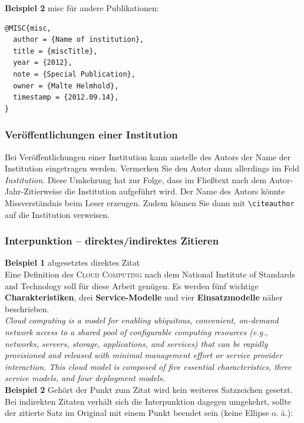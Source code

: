 \documentclass[xlevel, hyperref, nat, mp]{wise}
\newcommand\code[1]{\texttt{#1}}
\newcommand\command[1]{\code{\textbackslash{}#1}}
\newcommand{\cc}{\textsc{Cloud Computing }}
\begin{document}
\textbf{Beispiel 2} misc für andere Publikationen: 
\begin{lstlisting}
@MISC{misc,
  author = {Name of institution},
  title = {miscTitle},
  year = {2012},
  note = {Special Publication},
  owner = {Malte Helmhold},
  timestamp = {2012.09.14},
}

\end{lstlisting} 

\subsubsection{Veröffentlichungen einer Institution}
Bei Veröffentlichungen einer Institution kann anstelle des Autors der Name der Institution eingetragen werden. Vermerken Sie den Autor dann allerdings im Feld \textit{Institution}. Diese Umkehrung hat zur Folge, dass im Fließtext nach dem Autor-Jahr-Zitierweise die Institution aufgeführt wird. Der Name des Autors könnte Missverständnis beim Leser erzeugen. Zudem können Sie dann mit \command{citeauthor} auf die Institution verweisen. 

\newpage
\subsubsection{Interpunktion -- direktes/indirektes Zitieren}


\textbf{Beispiel 1} abgesetztes direktes Zitat\\

Eine Definition des \cc  nach dem National Institute of Standards and Technology \cite{nist11} soll für diese Arbeit genügen. Es werden fünf wichtige {\bf Charakteristiken}, drei {\bf Service-Modelle} und vier {\bf Einsatzmodelle} näher beschrieben.\\

\textit{\glqq Cloud computing is a model for enabling ubiquitous, convenient, on-demand network access to a shared pool of configurable computing resources (e.g., networks, servers, storage, applications, and services) that can be rapidly provisioned and released with minimal management effort or service provider interaction. This cloud model is composed of five essential characteristics, three service models, and four deployment 
models.\grqq} \\


\textbf{Beispiel 2} Gehört der Punkt zum Zitat wird kein weiteres Satzzeichen gesetzt. Bei indirekten Zitaten verhält sich die Interpunktion dagegen umgekehrt, sollte der zitierte Satz im Original mit einem Punkt beendet sein (keine Ellipse o. ä.):\\
\end{document}
